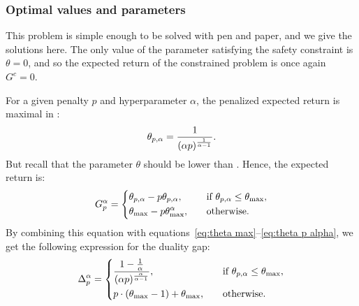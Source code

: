 \subsubsection{Optimal values and parameters}
This problem is simple enough to be solved with pen and paper, and we give the solutions here. The only value of the parameter satisfying the safety constraint is $\theta = 0$, and so the expected return of the constrained problem is once again $G^c = 0$.\par
For a given penalty $p$ and hyperparameter $\alpha$, the penalized expected return is maximal in :
\begin{equation}
	\theta_{p, \alpha} = \frac{1}{(\alpha p)^\frac{1}{\alpha - 1}}.\label{eq:theta p alpha}
\end{equation}
But recall that the parameter $\theta$ should be lower than \thetamax. Hence, the expected return is:
\begin{equation*}
	G_p^\alpha = \begin{dcases}
		\theta_{p, \alpha} - p \theta_{p, \alpha},&\quad\text{if}~\theta_{p, \alpha}\leq\theta_\text{max},\\
		\theta_\text{max} - p \theta_\text{max}^\alpha,&\quad\text{otherwise}.
	\end{dcases}
\end{equation*}
By combining this equation with equations~\eqref{eq:theta max}--\eqref{eq:theta p alpha}, we get the following expression for the duality gap:
\begin{equation}
	\Delta_p^\alpha = \begin{dcases}
	\frac{1 - \frac{1}{\alpha}}{(\alpha p)^\frac{\alpha}{\alpha - 1}}, &\quad\text{if}~\theta_{p, \alpha}\leq\theta_\text{max},\\
	p\cdot(\theta_\text{max} - 1) + \theta_\text{max},&\quad\text{otherwise}.
	\end{dcases} \label{eq:duality gap}
\end{equation}

